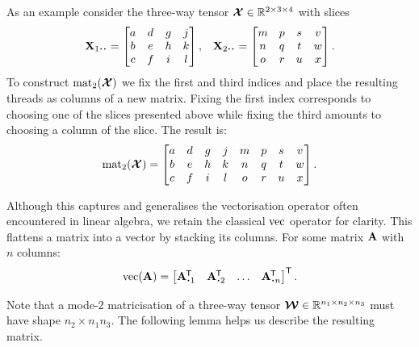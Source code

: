As an example consider the three-way tensor \(\bm{\mathcal{X}} \in \mathbb{R}^{2 \times 3 \times 4}\)
with slices
\begin{align} \label{eq:slicies}
	&\mat{X}_{1 \midbullet \midbullet} = \begin{bmatrix}
		a & d & g & j \\
		b & e & h & k \\
		c & f & i & l \\
	\end{bmatrix},
	&\mat{X}_{2 \midbullet \midbullet} = \begin{bmatrix}
		m & p & s & v \\
		n & q & t & w \\
		o & r & u & x \\
	\end{bmatrix}.
\end{align} To construct \(\operatorname{mat}_2(\bm{\mathcal{X}})\) we fix the first and third indices and place the
resulting threads as columns of a new matrix. Fixing the first index corresponds to choosing one of
the slices presented above while fixing the third amounts to choosing a column of the slice.
The result is:
\begin{equation}\label{eq:matricisedeg}
	\operatorname{mat}_2(\bm{\mathcal{X}}) = \begin{bmatrix}
		a & d & g & j & m & p & s & v \\
		b & e & h & k & n & q & t & w \\
		c & f & i & l & o & r & u & x
	\end{bmatrix}.
\end{equation}

Although this captures and generalises the vectorisation operator often
encountered in linear algebra, we retain the classical \(\operatorname{vec}\) operator for clarity.
This flattens a matrix into a vector by stacking its columns. For some matrix \(\mathbf{A}\) with
\(n\) columns:
\begin{equation}\label{eq:vec}
	\vect(\mat{A}) = \begin{bmatrix}
		\tran{\vec{A}_{\midbullet 1}} &
		\tran{\vec{A}_{\midbullet 2}} &
		\ldots &
		\tran{\vec{A}_{\midbullet n}}
	\end{bmatrix}^\mathsf{T}.
\end{equation}

Note that a 
mode-2 matricisation of a
three-way tensor \(\bm{\mathcal{W}} \in \mathbb{R}^{n_1\times n_2\times n_3}\) must have shape
\(n_2 \times n_1n_3\). The following lemma helps us describe the resulting matrix.


